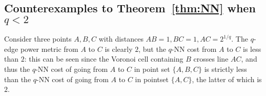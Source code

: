 \subsection{Counterexamples to Theorem~\ref{thm:NN} when $q < 2$}
Consider three points $A, B, C$ with distances $AB = 1, BC=1,AC= 2^{1/q}$.
The $q$-edge power metric from $A$ to $C$ is clearly $2$, but the $q$-NN
cost from $A$ to $C$ is less than $2$: this can be seen since the Voronoi
cell containing $B$ crosses line $AC$, and thus the $q$-NN cost of going
from $A$ to $C$ in point set $\{A,B,C\}$ is strictly less than the $q$-NN
cost of going from $A$ to $C$ in pointset $\{A,C\}$, the latter of which is
$2$.
